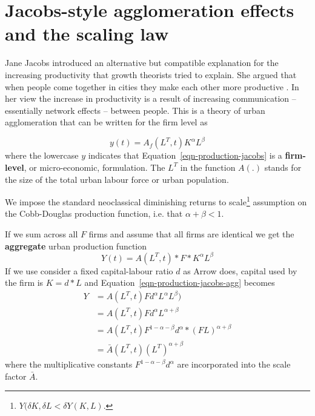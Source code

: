 \section{Jacobs-style agglomeration effects and the scaling law}

Jane Jacobs introduced an alternative but compatible explanation for the increasing productivity that growth theorists tried to explain. She argued that when people come together in cities they make each other more productive \cite{jacobsEconomyCities1969}. In her view the increase in productivity is a result of increasing communication -- essentially network effects -- between people.  This is  a theory of urban agglomeration that can be written for the firm level as%

\begin{equation}
y(t) = A_f(L^T,t) K^\alpha L^\beta 
\label{eqn-production-jacobs}
\end{equation}
where the  lowercase $y$  indicates that Equation~\ref{eqn-production-jacobs} is a \textbf{firm-level}, or micro-economic, formulation. The $L^T$  in the function $A(.)$ stands for the size of the total urban labour force or urban population.

We impose the standard neoclassical diminishing returns to scale\footnote{$Y(\delta K,\delta L< \delta Y(K,L)$.} assumption on the \gls{Cobb-Douglas} production function, i.e. that 
$\alpha +\beta <1 $.  
 

If we sum across all $F$ firms and assume that all firms are identical we get the \textbf{aggregate} urban production function
\begin{equation}
Y(t) = A(L^T, t)* F *K^\alpha L^\beta 
\label{eqn-production-jacobs-agg}
\end{equation}
If we use consider a fixed capital-labour ratio $d$ as Arrow does,  capital used by the firm is  $K=d*L$ and Equation~\ref{eqn-production-jacobs-agg} becomes
\begin{align}
Y &= A(L^T, t) F d^\alpha L^\alpha L^\beta) \nonumber\\
&=A(L^T, t)F d^\alpha L^{\alpha +\beta} \nonumber\\
&= A(L^T, t) F^{1-\alpha -\beta}d^\alpha * (F L)^{\alpha +\beta} \nonumber \\
&=\bar A(L^T, t) (L^T)^{\alpha +\beta}  
 \label{eqn-production-jacobs-city-2}
\end{align} 
where the  multiplicative constants  $F^{1-\alpha -\beta}d^\alpha $ are incorporated into the scale factor $\bar A$. 

